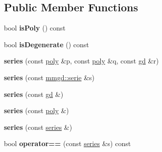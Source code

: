 \subsection*{Public Member Functions}
\begin{DoxyCompactItemize}
\item 
\mbox{\label{classetvo_i_i_1_1series_ad55faeed0e6e60f6c40e4a9458795230}} 
bool {\bfseries is\+Poly} () const
\item 
\mbox{\label{classetvo_i_i_1_1series_af1334a4b82caff1f0458b468c2d966a1}} 
bool {\bfseries is\+Degenerate} () const
\item 
\mbox{\label{classetvo_i_i_1_1series_af3c56a956329c27d606323537fe9122d}} 
{\bfseries series} (const \mbox{\hyperlink{classetvo_i_i_1_1poly}{poly}} \&p, const \mbox{\hyperlink{classetvo_i_i_1_1poly}{poly}} \&q, const \mbox{\hyperlink{classetvo_i_i_1_1gd}{gd}} \&r)
\item 
\mbox{\label{classetvo_i_i_1_1series_ab693b0db1b3a141e4d5633e85e3ed91f}} 
{\bfseries series} (const \mbox{\hyperlink{classmmgd_1_1serie}{mmgd\+::serie}} \&s)
\item 
\mbox{\label{classetvo_i_i_1_1series_a75571b7e6f2693c773412a61859eea05}} 
{\bfseries series} (const \mbox{\hyperlink{classetvo_i_i_1_1gd}{gd}} \&)
\item 
\mbox{\label{classetvo_i_i_1_1series_a27a88526dfdc0e5147ba43af78a2faf2}} 
{\bfseries series} (const \mbox{\hyperlink{classetvo_i_i_1_1poly}{poly}} \&)
\item 
\mbox{\label{classetvo_i_i_1_1series_aa7f6009dfba508eed2b8a61ff394a011}} 
{\bfseries series} (const \mbox{\hyperlink{classetvo_i_i_1_1series}{series}} \&)
\item 
\mbox{\label{classetvo_i_i_1_1series_ac029c2e83d3990a27e75910ac2d9b9cd}} 
bool {\bfseries operator==} (const \mbox{\hyperlink{classetvo_i_i_1_1series}{series}} \&s) const
\item 
\mbox{\label{classetvo_i_i_1_1series_a49f8eaf62350933b376a6fd2b51cc664}} 

\end{DoxyCompactItemize}
